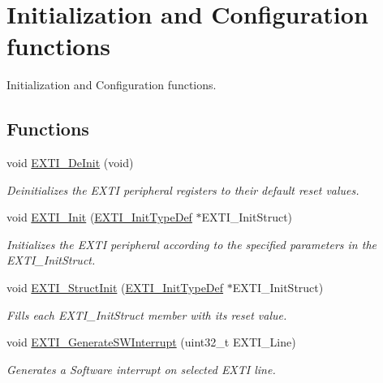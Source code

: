 \hypertarget{group___e_x_t_i___group1}{}\section{Initialization and Configuration functions}
\label{group___e_x_t_i___group1}


Initialization and Configuration functions.  


\subsection*{Functions}
\begin{DoxyCompactItemize}
\item 
void \hyperlink{group___e_x_t_i___group1_ga07072e339cb9ecb9cd9d4b94afc9f317}{E\+X\+T\+I\+\_\+\+De\+Init} (void)
\begin{DoxyCompactList}\small\item\em Deinitializes the E\+X\+T\+I peripheral registers to their default reset values. \end{DoxyCompactList}\item 
void \hyperlink{group___e_x_t_i___group1_ga8c9ce6352a3a2dfc8fc9287cb24c6501}{E\+X\+T\+I\+\_\+\+Init} (\hyperlink{struct_e_x_t_i___init_type_def}{E\+X\+T\+I\+\_\+\+Init\+Type\+Def} $\ast$E\+X\+T\+I\+\_\+\+Init\+Struct)
\begin{DoxyCompactList}\small\item\em Initializes the E\+X\+T\+I peripheral according to the specified parameters in the E\+X\+T\+I\+\_\+\+Init\+Struct. \end{DoxyCompactList}\item 
void \hyperlink{group___e_x_t_i___group1_ga86b9e662d18a2f829999cfb26aa7ca20}{E\+X\+T\+I\+\_\+\+Struct\+Init} (\hyperlink{struct_e_x_t_i___init_type_def}{E\+X\+T\+I\+\_\+\+Init\+Type\+Def} $\ast$E\+X\+T\+I\+\_\+\+Init\+Struct)
\begin{DoxyCompactList}\small\item\em Fills each E\+X\+T\+I\+\_\+\+Init\+Struct member with its reset value. \end{DoxyCompactList}\item 
void \hyperlink{group___e_x_t_i___group1_ga897e8ea59f40a19e047fb9994876fc9b}{E\+X\+T\+I\+\_\+\+Generate\+S\+W\+Interrupt} (uint32\+\_\+t E\+X\+T\+I\+\_\+\+Line)
\begin{DoxyCompactList}\small\item\em Generates a Software interrupt on selected E\+X\+T\+I line. \end{DoxyCompactList}\end{DoxyCompactItemize}


